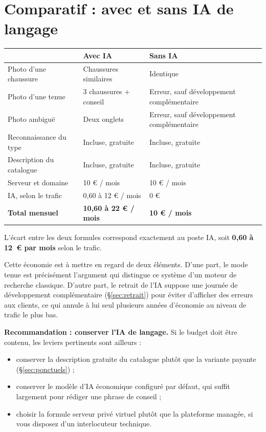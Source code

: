 \documentclass[11pt,a4paper]{article}
\begin{document}
\section{Comparatif : avec et sans IA de langage}
\label{sec:comparatif}

\begin{tabularx}{\textwidth}{L{4.4cm} X X}
\toprule
& \textbf{Avec IA} & \textbf{Sans IA} \\
\midrule
Photo d'une chaussure & Chaussures similaires & Identique \\
Photo d'une tenue & 3 chaussures + conseil & Erreur, sauf développement
complémentaire \\
Photo ambiguë & Deux onglets & Erreur, sauf développement complémentaire \\
Reconnaissance du type & Incluse, gratuite & Incluse, gratuite \\
Description du catalogue & Incluse, gratuite & Incluse, gratuite \\
\midrule
Serveur et domaine & 10 € / mois & 10 € / mois \\
IA, selon le trafic & 0,60 à 12 € / mois & 0 € \\
\midrule
\textbf{Total mensuel} & \textbf{10,60 à 22 € / mois} & \textbf{10 € / mois} \\
\bottomrule
\end{tabularx}

\vspace{1.2em}
L'écart entre les deux formules correspond exactement au poste IA, soit
\textbf{0,60 à 12~€ par mois} selon le trafic.

Cette économie est à mettre en regard de deux éléments. D'une part, le mode
tenue est précisément l'argument qui distingue ce système d'un moteur de
recherche classique. D'autre part, le retrait de l'IA suppose une journée de
développement complémentaire (§\ref{sec:retrait}) pour éviter d'afficher des
erreurs aux clients, ce qui annule à lui seul plusieurs années d'économie au
niveau de trafic le plus bas.

\vspace{0.5em}
\noindent
\textbf{Recommandation : conserver l'IA de langage.} Si le budget doit être
contenu, les leviers pertinents sont ailleurs :

\begin{itemize}
  \item conserver la description gratuite du catalogue plutôt que la variante
  payante (§\ref{sec:ponctuels}) ;
  \item conserver le modèle d'IA économique configuré par défaut, qui suffit
  largement pour rédiger une phrase de conseil ;
  \item choisir la formule serveur privé virtuel plutôt que la plateforme
  managée, si vous disposez d'un interlocuteur technique.
\end{itemize}
\end{document}
